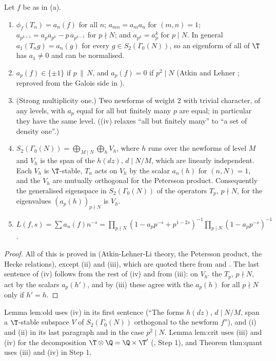 \begin{proposition}\label{prop:modgalrep:newforms-recap}
Let $f$ be as in (a).
\begin{enumerate}[label=(\roman*)]
\item $\phi_f(T_n)=a_n(f)$ for all $n$; $a_{mn}=a_ma_n$ for $(m,n)=1$; $a_{p^{k+1}}=a_pa_{p^k}-p\,a_{p^{k-1}}$ for $p\nmid N$; and $a_{p^k}=a_p^k$ for $p\mid N$. In general $a_1(T_ng)=a_n(g)$ for
every $g\in S_2(\Gamma_0(N))$, so an eigenform of all of $\T$ has $a_1\ne0$ and can be normalised.
\item $a_p(f)\in\{\pm1\}$ if $p\,\|\,N$, and $a_p(f)=0$ if $p^2\mid N$ (Atkin and Lehner \cite[Theorem 3]{AtkinLehner70}; reproved from the Galois side in
).
\item (Strong multiplicity one.) Two newforms of weight $2$ with trivial character, of any levels, with $a_p$ equal for all but finitely many $p$ are
equal; in particular they have the same level. ((iv) relaxes ``all but finitely many'' to ``a set of
density one''.)
\item $S_2(\Gamma_0(N))=\bigoplus_{M\mid N}\bigoplus_h V_h$, where $h$ runs over the newforms of level $M$ and $V_h$ is the span of the $h(dz)$, $d\mid N/M$, which are
linearly independent. Each $V_h$ is $\T$-stable, $T_n$ acts on $V_h$ by the scalar $a_n(h)$ for $(n,N)=1$, and the $V_h$ are mutually orthogonal for the
Petersson product. Consequently the generalised eigenspace in $S_2(\Gamma_0(N))$ of the operators $T_p$, $p\nmid N$, for the eigenvalues $(a_p(h))_{p\nmid N}$ is
$V_h$.
\item $L(f,s)=\sum a_n(f)n^{-s}=\prod_{p\nmid N}(1-a_pp^{-s}+p^{1-2s})^{-1}\prod_{p\mid N}(1-a_pp^{-s})^{-1}$.
\end{enumerate}
\end{proposition}

\begin{proof}
All of this is proved in  (Atkin-Lehner-Li theory, the Petersson product, the Hecke relations), except (ii) and (iii), which
are quoted there from \cite{AtkinLehner70} and \cite[Chapter 5]{DiamondShurman}. The last sentence of (iv) follows from the rest of (iv) and from (iii):
on $V_{h'}$ the $T_p$, $p\nmid N$, act by the scalars $a_p(h')$, and by (iii) these agree with the $a_p(h)$ for all $p\nmid N$ only if $h'=h$.
\end{proof}

\begin{paperlink}
Lemma lem:old uses (iv) in its first sentence (``The forms $h(dz)$, $d\mid N/M$, span a $\T$-stable subspace $V$ of $S_2(\Gamma_0(N))$ orthogonal to the newform
$f$''), and (i) and (ii) in its last paragraph and in the case $p^2\mid N$. Lemma lem:crit uses (iii) and (iv) for the decomposition $\T\otimes\Q=\Q\times\T'$
(, Step 1), and Theorem thm:quant uses (iii) and (iv) in Step 1.
\end{paperlink}

